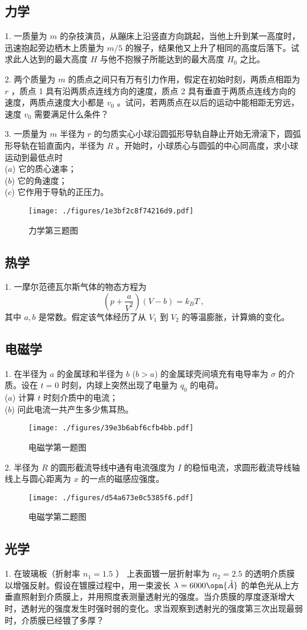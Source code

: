 \subsection{力学}
1. 一质量为 $m$ 的杂技演员，从蹦床上沿竖直方向跳起，当他上升到某一高度时，迅速抱起旁边栖木上质量为 $m/5$ 的猴子，结果他又上升了相同的高度后落下。试求此人达到的最大高度 $H$ 与他不抱猴子所能达到的最大高度 $H_{0}$ 之比。

2. 两个质量为 $m$ 的质点之间只有万有引力作用，假定在初始时刻，两质点相距为 $r$ ，质点 1 具有沿两质点连线方向的速度，质点 2 具有垂直于两质点连线方向的速度，两质点速度大小都是 $v_{0}$ 。试问，若两质点在以后的运动中能相距无穷远，速度 $v_0$ 需要满足什么条件？

3. 一质量为 $m$ 半径为 $r$ 的匀质实心小球沿圆弧形导轨自静止开始无滑滚下，圆弧形导轨在铅直面内，半径为 $R$ 。开始时，小球质心与圆弧的中心同高度，求小球运动到最低点时\\ 
($a$) 它的质心速率；\\
($b$) 它的角速度；\\
($c$) 它作用于导轨的正压力。
\begin{figure}[ht]
\centering
\texttt{[image: ./figures/1e3bf2c8f74216d9.pdf]}
\caption{力学第三题图} \label{fig_NJU17_1}
\end{figure}
\subsection{热学}
1. 一摩尔范德瓦尔斯气体的物态方程为 
\begin{equation}
\left(p+\frac{a}{V^{2}}\right)(V-b)=k_{B} T~,
\end{equation}
其中 $a, b$ 是常数。假定该气体经历了从 $V_{1}$ 到 $V_{2}$ 的等温膨胀，计算熵的变化。
\subsection{电磁学}
1. 在半径为 $a$ 的金属球和半径为 $b$ ($b>a$) 的金属球壳间填充有电导率为 $\sigma$ 的介质。设在 $t=0$ 时刻，内球上突然出现了电量为 $q_0$ 的电荷。\\
($a$) 计算 $t$ 时刻介质中的电流；\\
($b$) 问此电流一共产生多少焦耳热。
\begin{figure}[ht]
\centering
\texttt{[image: ./figures/39e3b6abf6cfb4bb.pdf]}
\caption{电磁学第一题图} \label{fig_NJU17_2}
\end{figure}
2. 半径为 $R$ 的圆形截流导线中通有电流强度为 $I$ 的稳恒电流，求圆形截流导线轴线上与圆心距离为 $x$ 的一点的磁感应强度。
\begin{figure}[ht]
\centering
\texttt{[image: ./figures/d54a673e0c5385f6.pdf]}
\caption{电磁学第二题图} \label{fig_NJU17_3}
\end{figure}
\subsection{光学}
1. 在玻璃板（折射率 $n_{1}=1.5$ ） 上表面镀一层折射率为 $n_{2}=2.5$ 的透明介质膜以增强反射。假设在镀膜过程中，用一束波长 $\lambda=6000 \opn{\mathring{A}}$ 的单色光从上方垂直照射到介质膜上，并用照度表测量透射光的强度。当介质膜的厚度逐渐增大时，透射光的强度发生时强时弱的变化。求当观察到透射光的强度第三次出现最弱时，介质膜已经镀了多厚？
